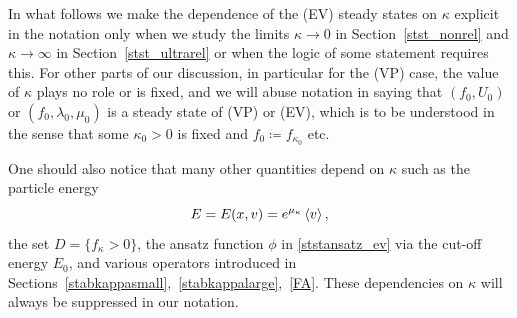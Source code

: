 \documentclass[11pt]{article}
\begin{document}
In what follows we make the dependence of the (EV) steady states
on $\kappa$ explicit in the notation only when we study the limits
$\kappa\to 0$ in Section~\ref{stst_nonrel} and $\kappa\to\infty$
in Section~\ref{stst_ultrarel} or when the logic of some statement
requires this.
For other parts of our discussion, in particular for the
(VP) case, the value of $\kappa$ plays no role or is fixed,
and we will abuse
notation in saying that $(f_0,U_0)$ or $(f_0,\lambda_0,\mu_0)$ is a steady
state of (VP) or (EV), which is to be understood in the sense
that some $\kappa_0>0$ is fixed and $f_0\coloneqq f_{\kappa_0}$ etc.

One should also notice that many other quantities depend on
$\kappa$ such as the particle energy
\[
E = E(x,v)=e^{\mu_\kappa}\left\langle v\right\rangle,
\]
the set $D= \{ f_\kappa >0\}$, the ansatz function $\phi$ in
\eqref{ststansatz_ev} via the cut-off energy $E_0$, and various operators
introduced in Sections~\ref{stabkappasmall},~\ref{stabkappalarge},~\ref{FA}.
These dependencies on $\kappa$ will always be suppressed in our notation.
\end{document}
